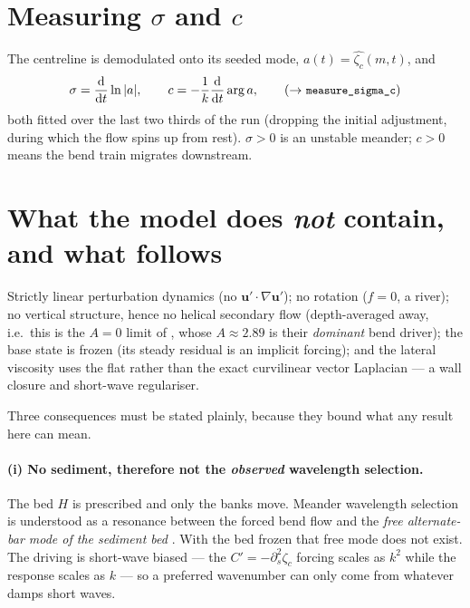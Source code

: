 \documentclass[11pt]{article}
\newcommand{\code}[1]{\texttt{\small #1}}
\begin{document}
\section{Measuring $\sigma$ and $c$}

The centreline is demodulated onto its seeded mode,
$a(t)=\widehat{\zeta_c}(m,t)$, and
\begin{equation}
  \sigma=\frac{\mathrm d}{\mathrm dt}\ln|a|,\qquad
  c=-\frac1k\frac{\mathrm d}{\mathrm dt}\arg a ,
  \tag{$\to$ \code{measure\_sigma\_c}}
\end{equation}
both fitted over the last two thirds of the run (dropping the initial adjustment,
during which the flow spins up from rest). $\sigma>0$ is an unstable meander;
$c>0$ means the bend train migrates downstream.

\section{What the model does \emph{not} contain, and what follows}
\label{sec:notcontain}

Strictly linear perturbation dynamics (no $\bm u'\!\cdot\!\nabla\bm u'$); no
rotation ($f=0$, a river); no vertical structure, hence no helical secondary flow
(depth-averaged away, i.e.\ this is the $A=0$ limit of \cite{ikeda1981}, whose
$A\approx2.89$ is their \emph{dominant} bend driver); the base state is frozen (its
steady residual is an implicit forcing); and the lateral viscosity uses the flat
rather than the exact curvilinear vector Laplacian --- a wall closure and short-wave
regulariser.

Three consequences must be stated plainly, because they bound what any result here
can mean.

\paragraph{(i) No sediment, therefore not the \emph{observed} wavelength selection.}
The bed $H$ is prescribed and only the banks move. Meander wavelength selection is
understood as a resonance between the forced bend flow and the \emph{free alternate-bar
mode of the sediment bed} \cite{blondeaux1985,seminara2006,camporeale2007}. With the bed
frozen that free mode does not exist. The driving is short-wave biased --- the
$C'=-\partial_s^2\zeta_c$ forcing scales as $k^2$ while the response scales as $k$ ---
so a preferred wavenumber can only come from whatever damps short waves.
\end{document}
